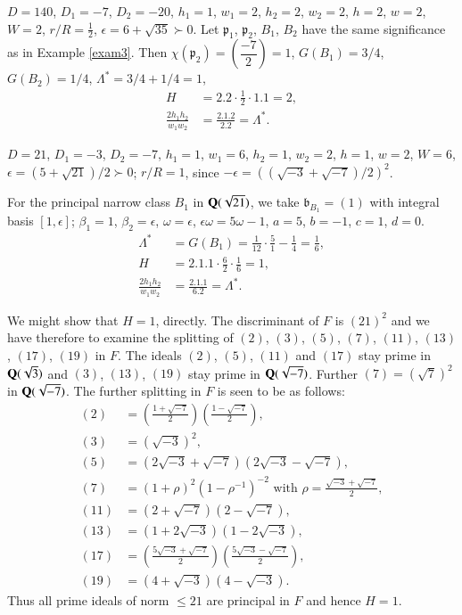 \begin{exam}\label{exam4}
$D=140$, $D_{1}=-7$, $D_{2}=-20$, $h_{1}=1$, $w_{1}=2$, $h_{2}=2$,
  $w_{2}=2$, $h=2$, $w=2$, $W=2$, $r/R=\frac{1}{2}$,
  $\epsilon=6+\sqrt{35} \succ 0$. Let $\mathfrak{p}_{1}$,
  $\mathfrak{p}_{2}$, $B_{1}$, $B_{2}$ have the same significance as
  in Example \ref{exam3}. Then
  $\chi(\mathfrak{p}_{2})=\left(\dfrac{-7}{2}\right)=1$,
  $G(B_{1})=3/4$, $G(B_{2})=1/4$, $\Lambda^{\ast}=3/4+1/4=1$,
\begin{align*}
H &= 2.2\cdot \frac{1}{2}\cdot 1.1=2,\\
\frac{2h_{1}h_{2}}{w_{1}w_{2}} &= \frac{2.1.2}{2.2}=\Lambda^{\ast}. 
\end{align*}
\end{exam}

\begin{exam}\label{exam5}
$D=21$, $D_{1}=-3$, $D_{2}=-7$, $h_{1}=1$, $w_{1}=6$, $h_{2}=1$,
  $w_{2}=2$, $h=1$, $w=2$, $W=6$, $\epsilon=(5+\sqrt{21})/2 \succ 0$;
  $r/R=1$, since $-\epsilon=((\sqrt{-3}+\sqrt{-7})/2)^{2}$.
\end{exam}

For the principal narrow class $B_{1}$ in $\mathbf{Q}(\sqrt{21})$, we take
$\mathfrak{b}_{B_{1}}=(1)$ with integral basis $[1,\epsilon]$;
$\beta_{1}=1$, $\beta_{2}=\epsilon$, $\omega=\epsilon$,
$\epsilon\omega=5\omega-1$, $a=5$, $b=-1$, $c=1$, $d=0$.
\begin{align*}
\Lambda^{\ast} &= G(B_{1})=\frac{1}{12}\cdot
\frac{5}{1}-\frac{1}{4}=\frac{1}{6},\\
H &= 2.1.1\cdot \frac{6}{2}\cdot \frac{1}{6}=1,\\
\frac{2h_{1}h_{2}}{w_{1}w_{2}} &= \frac{2.1.1}{6.2}=\Lambda^{\ast}. 
\end{align*}\pageoriginale

We might show that $H=1$, directly. The discriminant of $F$ is
$(21)^{2}$ and we have therefore to examine the splitting of $(2)$,
$(3)$, $(5)$, $(7)$, $(11)$, $(13)$, $(17)$, $(19)$ in $F$. The ideals
$(2)$, $(5)$, $(11)$ and $(17)$ stay prime in $\mathbf{Q}(\sqrt{3})$ and
$(3)$, $(13)$, $(19)$ stay prime in $\mathbf{Q}(\sqrt{-7})$. Further
$(7)=(\sqrt{7})^{2}$ in $\mathbf{Q}(\sqrt{-7})$. The further splitting in $F$
is seen to be as follows:
\begin{align*}
(2) &=
  \left(\frac{1+\sqrt{-7}}{2}\right)\left(\frac{1-\sqrt{-7}}{2}\right),\\
(3) &= (\sqrt{-3})^{2},\\
(5) &= (2\sqrt{-3}+\sqrt{-7})(2\sqrt{-3}-\sqrt{-7}),\\
(7) &= (1+\rho)^{2}(1-\rho^{-1})^{-2}\text{ \  with \ }
  \rho=\frac{\sqrt{-3}+\sqrt{-7}}{2},\\
(11) &= (2+\sqrt{-7})(2-\sqrt{-7}),\\
(13) &= (1+2\sqrt{-3})(1-2\sqrt{-3}),\\
(17) &=
  \left(\frac{5\sqrt{-3}+\sqrt{-7}}{2}\right)\left(\frac{5\sqrt{-3}-\sqrt{-7}}{2}\right),\\
(19) &= (4+\sqrt{-3})(4-\sqrt{-3}).
\end{align*}
Thus all prime ideals of norm $\leq 21$ are principal in $F$ and hence
$H=1$.


